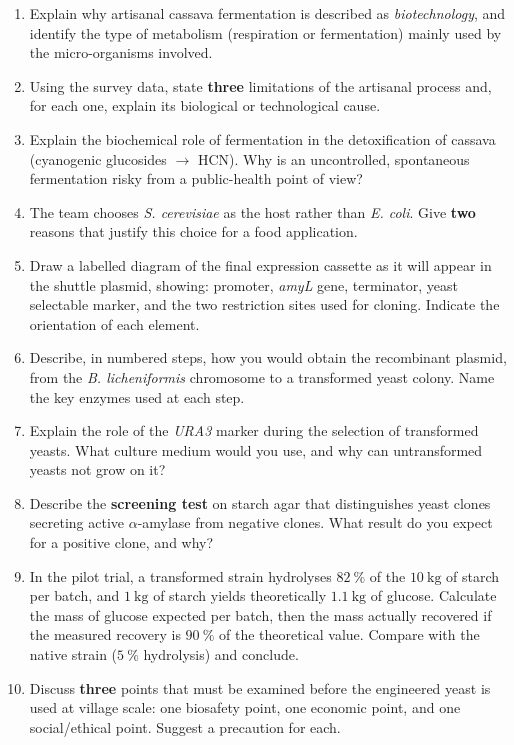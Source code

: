 \documentclass[11pt]{article}
\begin{document}
\begin{enumerate}
\item Explain why artisanal cassava fermentation is described as \emph{biotechnology}, and identify the type of metabolism (respiration or fermentation) mainly used by the micro-organisms involved.
\item Using the survey data, state \textbf{three} limitations of the artisanal process and, for each one, explain its biological or technological cause.
\item Explain the biochemical role of fermentation in the detoxification of cassava (cyanogenic glucosides $\rightarrow$ HCN). Why is an uncontrolled, spontaneous fermentation risky from a public-health point of view?
\item The team chooses \emph{S. cerevisiae} as the host rather than \emph{E. coli}. Give \textbf{two} reasons that justify this choice for a food application.
\item Draw a labelled diagram of the final expression cassette as it will appear in the shuttle plasmid, showing: promoter, \emph{amyL} gene, terminator, yeast selectable marker, and the two restriction sites used for cloning. Indicate the orientation of each element.
\item Describe, in numbered steps, how you would obtain the recombinant plasmid, from the \emph{B. licheniformis} chromosome to a transformed yeast colony. Name the key enzymes used at each step.
\item Explain the role of the \emph{URA3} marker during the selection of transformed yeasts. What culture medium would you use, and why can untransformed yeasts not grow on it?
\item Describe the \textbf{screening test} on starch agar that distinguishes yeast clones secreting active $\alpha$-amylase from negative clones. What result do you expect for a positive clone, and why?
\item In the pilot trial, a transformed strain hydrolyses $82\ \%$ of the $10\ \mathrm{kg}$ of starch per batch, and $1\ \mathrm{kg}$ of starch yields theoretically $1.1\ \mathrm{kg}$ of glucose. Calculate the mass of glucose expected per batch, then the mass actually recovered if the measured recovery is $90\ \%$ of the theoretical value. Compare with the native strain ($5\ \%$ hydrolysis) and conclude.
\item Discuss \textbf{three} points that must be examined before the engineered yeast is used at village scale: one biosafety point, one economic point, and one social/ethical point. Suggest a precaution for each.
\end{enumerate}
\end{document}
